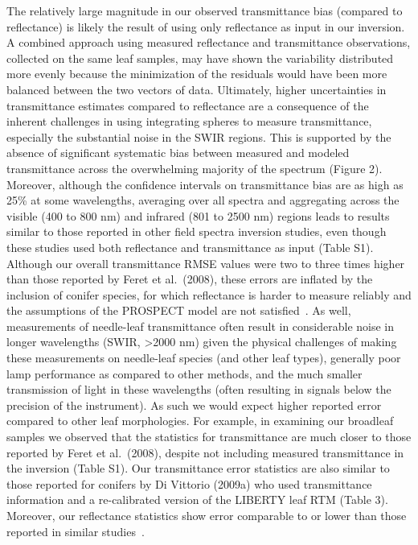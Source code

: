 The relatively large magnitude in our observed transmittance bias (compared to reflectance) is likely the result of using only reflectance as input in our inversion.
A combined approach using measured reflectance and transmittance observations, collected on the same leaf samples, may have shown the variability distributed more evenly because the minimization of the residuals would have been more balanced between the two vectors of data.
Ultimately, higher uncertainties in transmittance estimates compared to reflectance are a consequence of the inherent challenges in using integrating spheres to measure transmittance, especially the substantial noise in the SWIR regions.
This is supported by the absence of significant systematic bias between measured and modeled transmittance across the overwhelming majority of the spectrum (Figure 2). %
Moreover, although the confidence intervals on transmittance bias are as high as 25\% at some wavelengths, averaging over all spectra and aggregating across the visible (400 to 800 nm) and infrared (801 to 2500 nm) regions leads to results similar to those reported in other field spectra inversion studies, even though these studies used both reflectance and transmittance as input (Table S1). %
Although our overall transmittance RMSE values were two to three times higher than those reported by Feret et al.~(2008), \nocite{feret_2008_prospect}
these errors are inflated by the inclusion of conifer species, for which reflectance is harder to measure reliably and the assumptions of the PROSPECT model are not satisfied~\cite{jacquemoud_1990_prospect,divittorio_2009_enhancing,allen_1969_interaction}.
As well, measurements of needle-leaf transmittance often result in considerable noise in longer wavelengths (SWIR, >2000 nm) given
the physical challenges of making these measurements on needle-leaf species (and other leaf types),
generally poor lamp performance as compared to other methods,
and the much smaller transmission of light in these wavelengths (often resulting in signals below the precision of the instrument).
As such we would expect higher reported error compared to other leaf morphologies.
For example, in examining our broadleaf samples we observed that the statistics for transmittance are much closer to those reported by Feret et al.~(2008), despite not including measured transmittance in the inversion (Table S1). \nocite{feret_2008_prospect} %
Our transmittance error statistics are also similar to those reported for conifers by Di Vittorio (2009a) who used transmittance information and a re-calibrated version of the LIBERTY leaf RTM (Table 3). %
Moreover, our reflectance statistics show error comparable to or lower than those reported in similar studies~\cite{feret_2008_prospect,divittorio_2009_enhancing}.

